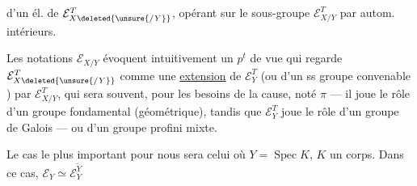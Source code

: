 
d'un él. de $\mathcal E_{X\deleted{\unsure{/Y}}}^T$, opérant sur le sous-groupe $\mathcal E_{X/Y}^T$ par autom. intérieurs.

Les notations  $\mathcal E_{X/Y}$ évoquent intuitivement un $p^t$ de vue qui regarde $\mathcal E_{X\deleted{\unsure{/Y}}}^T$ comme une \uline{extension} de $\mathcal E_Y^T$ (ou d'un ss groupe convenable ) par $\mathcal E_{X/Y}^T$, qui sera souvent, pour les besoins de la cause, noté $\pi$ --- il joue le rôle d'un groupe fondamental (géométrique), tandis que $\mathcal E_Y^T$ joue le rôle d'un groupe de Galois --- ou d'un groupe profini mixte.


Le cas le plus important pour nous sera celui où $Y=\operatorname{Spec}K$, $K$ un corps.  Dans ce cas, $\mathcal E_Y\simeq\mathcal E_Y^{\widetilde Y}$

